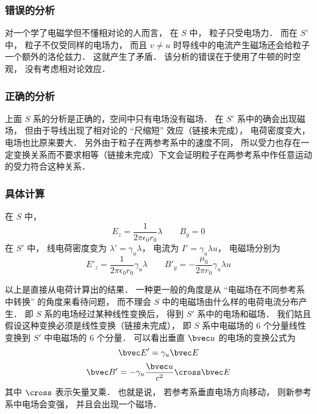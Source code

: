 \subsubsection{错误的分析}
对一个学了电磁学但不懂相对论的人而言， 在 $S$ 中， 粒子只受电场力． 而在 $S'$ 中， 粒子不仅受同样的电场力， 而且 $v \ne u$ 时导线中的电流产生磁场还会给粒子一个额外的洛伦兹力． 这就产生了矛盾． 该分析的错误在于使用了牛顿的时空观， 没有考虑相对论效应．

\subsubsection{正确的分析}
上面 $S$ 系的分析是正确的，空间中只有电场没有磁场． 在 $S'$ 系中的确会出现磁场， 但由于导线出现了相对论的 “尺缩短” 效应（链接未完成）， 电荷密度变大， 电场也比原来要大． 另外由于粒子在两参考系中的速度不同， 所以受力也存在一定变换关系而不要求相等（链接未完成）下文会证明粒子在两参考系中作任意运动的受力符合这种关系．

\subsubsection{具体计算}
在 $S$ 中，
\begin{equation}
E_{z} = \frac{1}{2\pi\epsilon_0 r_0} \lambda
\qquad
B_{y} = 0
\end{equation}
在 $S'$ 中， 线电荷密度变为 $\lambda' = \gamma_u \lambda$， 电流为 $I' = \gamma_u \lambda u$， 电磁场分别为
\begin{equation}
E'_z = \frac{1}{2\pi\epsilon_0 r_0} \gamma_u \lambda
\qquad
B'_y = -\frac{\mu_0}{2\pi r_0}\gamma_u \lambda u
\end{equation}

以上是直接从电荷计算出的结果． 一种更一般的角度是从 “电磁场在不同参考系中转换” 的角度来看待问题， 而不理会 $S$ 中的电磁场由什么样的电荷电流分布产生． 即 $S$ 系的电场经过某种线性变换后， 得到 $S'$ 系中的电场和磁场． 我们姑且假设这种变换必须是线性变换（链接未完成）， 即 $S$ 系中电磁场的 6 个分量线性变换到 $S'$ 中电磁场的 6 个分量． 可以看出垂直 $\bvec u$ 的电场的变换公式为
\begin{equation}\label{EMRef_eq5}
\bvec E' = \gamma_u \bvec E
\end{equation}
\begin{equation}\label{EMRef_eq6}
\bvec B' = -\gamma_u \frac{\bvec u}{c^2} \cross \bvec E
\end{equation}
其中 $\cross$ 表示矢量叉乘． 也就是说， 若参考系垂直电场方向移动， 则新参考系中电场会变强， 并且会出现一个磁场．

